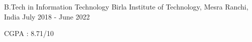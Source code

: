 \vspace{-2mm}


\begin{cventries}

  \cventry
    {B.Tech in Information Technology} %
    {Birla Institute of Technology, Mesra} %
    {Ranchi, India} %
    {July 2018 - June 2022} %
    {
      \begin{cvitems} %
        \item {CGPA : 8.71/10}
      \end{cvitems}
    }

\end{cventries}
